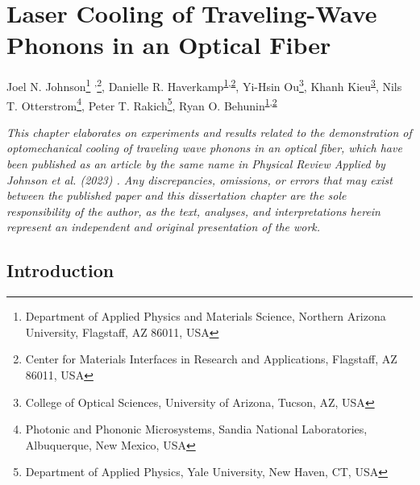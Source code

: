 \setcounter{rownumber}{0}
\chapter{Laser Cooling of Traveling-Wave Phonons in an Optical Fiber}
\label{ch:Cooling}
\acresetall

Joel N. Johnson\footnote{\label{Cooling-NAU}
Department of Applied Physics and Materials Science, Northern Arizona University, Flagstaff, AZ 86011, USA}%
\textsuperscript{,}\footnote{\label{Cooling-MIRA}
Center for Materials Interfaces in Research and Applications, Flagstaff, AZ 86011, USA},
Danielle R. Haverkamp\textsuperscript{\ref{Cooling-NAU},\ref{Cooling-MIRA}},
Yi-Hsin Ou\footnote{\label{Cooling-UofA}
College of Optical Sciences, University of Arizona, Tucson, AZ, USA},
Khanh Kieu\textsuperscript{\ref{Cooling-UofA}},
Nils T. Otterstrom\footnote{\label{Cooling-Sandia}
Photonic and Phononic Microsystems, Sandia National Laboratories, Albuquerque, New Mexico, USA},
Peter T. Rakich\footnote{\label{Cooling-Yale}
Department of Applied Physics, Yale University, New Haven, CT, USA},
Ryan O. Behunin\textsuperscript{\ref{Cooling-NAU},\ref{Cooling-MIRA}}

\hfill

\textit{This chapter elaborates on experiments and results related to the demonstration of optomechanical cooling of traveling wave phonons in an optical fiber, which have been published as an article by the same name in Physical Review Applied by Johnson et al. (2023) \cite{johnson2023laser}. Any discrepancies, omissions, or errors that may exist between the published paper and this dissertation chapter are the sole responsibility of the author, as the text, analyses, and interpretations herein represent an independent and original presentation of the work.}


\section{Introduction}
\label{Cooling:sec:Introduction}

